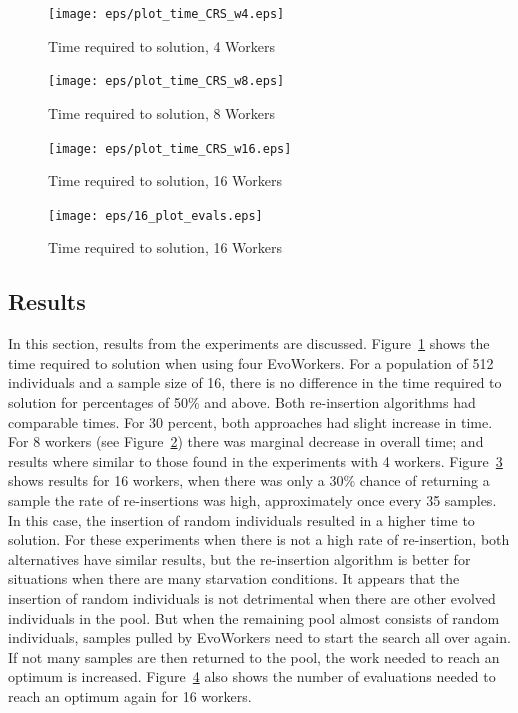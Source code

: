 \documentclass{llncs}
\begin{document}
\begin{figure}[t]
\centering
\texttt{[image: eps/plot\_time\_CRS\_w4.eps]}
\caption{Time required to solution, 4 Workers}
\label{fig:plot_time_ri_w4}
\end{figure}

\begin{figure}[!t]
\centering
\texttt{[image: eps/plot\_time\_CRS\_w8.eps]}
\caption{Time required to solution, 8 Workers}
\label{fig:plot_time_ri_w8}
\end{figure}


\begin{figure}[!t]
\centering
\texttt{[image: eps/plot\_time\_CRS\_w16.eps]}
\caption{Time required to solution, 16 Workers}
\label{fig:plot_time_ri_w16}
\end{figure}


\begin{figure}[t]
\centering
\texttt{[image: eps/16\_plot\_evals.eps]}
\caption{Time required to solution, 16 Workers}
\label{fig:plot_evals_w16}
\end{figure}


\subsection{Results}
In this section, results from the experiments are discussed. 
Figure~\ref{fig:plot_time_ri_w4} shows the time required 
to solution when using four EvoWorkers. For a population of
512 individuals and a sample size of 16, there is no
difference in the time required to solution for 
percentages of 50\% and above. Both re-insertion algorithms
had comparable times. For 30 percent, both approaches 
had slight increase in time. For 8 workers 
(see Figure~\ref{fig:plot_time_ri_w8})  there was marginal
decrease in overall time; and results where 
similar to those found in the experiments with 4 workers.  
Figure~\ref{fig:plot_time_ri_w16} shows results for 16 workers,
when there was only a 30\% chance of returning a sample 
the rate of re-insertions was high, approximately once every 35
samples. In this case, the insertion of random individuals 
resulted in a higher time to solution. For these experiments
when there is not a high rate of re-insertion, both alternatives
have similar results, but the re-insertion algorithm is better
for situations when there are many starvation conditions. It appears
that the insertion of random individuals is not detrimental when there
are other evolved individuals in the pool. But when the remaining
pool almost consists of random individuals, samples pulled by
EvoWorkers need to start the search all over again. If not many
samples are then returned to the pool, the work needed to reach an
optimum is increased. Figure~\ref{fig:plot_evals_w16} also shows the number 
of evaluations needed to reach an optimum again for 16 workers.
\end{document}
